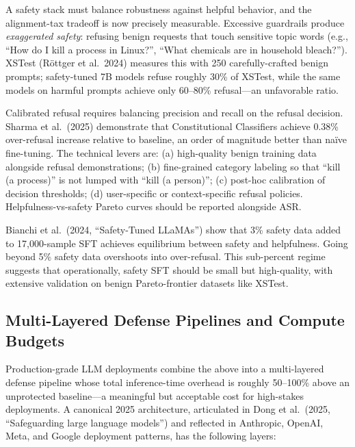 A safety stack must balance robustness against helpful behavior, and the alignment-tax tradeoff is now precisely measurable. Excessive guardrails produce \emph{exaggerated safety}: refusing benign requests that touch sensitive topic words (e.g., ``How do I kill a process in Linux?'', ``What chemicals are in household bleach?''). XSTest (Röttger et al.~2024) measures this with 250 carefully-crafted benign prompts; safety-tuned 7B models refuse roughly 30\% of XSTest, while the same models on harmful prompts achieve only 60--80\% refusal---an unfavorable ratio.

Calibrated refusal requires balancing precision and recall on the refusal decision. Sharma et al.~(2025) demonstrate that Constitutional Classifiers achieve 0.38\% over-refusal increase relative to baseline, an order of magnitude better than naïve fine-tuning. The technical levers are: (a) high-quality benign training data alongside refusal demonstrations; (b) fine-grained category labeling so that ``kill (a process)'' is not lumped with ``kill (a person)''; (c) post-hoc calibration of decision thresholds; (d) user-specific or context-specific refusal policies. Helpfulness-vs-safety Pareto curves should be reported alongside ASR.

Bianchi et al.~(2024, ``Safety-Tuned LLaMAs'') show that 3\% safety data added to 17,000-sample SFT achieves equilibrium between safety and helpfulness. Going beyond 5\% safety data overshoots into over-refusal. This sub-percent regime suggests that operationally, safety SFT should be small but high-quality, with extensive validation on benign Pareto-frontier datasets like XSTest.

\subsection{Multi-Layered Defense Pipelines and Compute Budgets}\label{multi-layered-defense-pipelines-and-compute-budgets}

Production-grade LLM deployments combine the above into a multi-layered defense pipeline whose total inference-time overhead is roughly 50--100\% above an unprotected baseline---a meaningful but acceptable cost for high-stakes deployments. A canonical 2025 architecture, articulated in Dong et al.~(2025, ``Safeguarding large language models'') and reflected in Anthropic, OpenAI, Meta, and Google deployment patterns, has the following layers:

